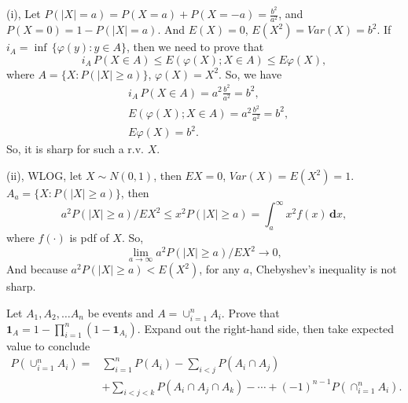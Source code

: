 \documentclass[en, normal, 11pt, black]{elegantnote}
\newenvironment{exercise}[1]{\begin{tcolorbox}[colback=black!15, colframe=black!80, breakable, title=#1]}{\end{tcolorbox}}
\renewenvironment{proof}{\begin{tcolorbox}[colback=white, colframe=black!50, breakable, title=Proof. ]\setlength{\parskip}{0.8em}}{\,\\\rightline{$\square$}\end{tcolorbox}}
\newcommand{\der}{\,\mathbf{d}}
\begin{document}
    \begin{proof}
        (i), Let $P(|X|=a)=P(X=a)+P(X=-a)=\frac{b^2}{a^2}$, and $P(X=0)=1-P(|X|=a)$. And $E(X)=0$, $E(X^2)=Var(X)=b^2$. If $i_{A}=\inf\,\{\varphi(y): y \in A\}$, then we need to prove that
        \[
            i_{A}\,P(X \in A) \leq E(\varphi(X) ; X \in A) \leq E \varphi(X), 
        \]
        where $A=\{X:P(|X|\geqslant a)\}$, $\varphi(X)=X^2$. So, we have
        \begin{align*}
            &i_{A}\,P(X \in A)=a^2\frac{b^2}{a^2}=b^2, \\
            &E(\varphi(X) ; X \in A)=a^2\frac{b^2}{a^2}=b^2, \\
            &E \varphi(X)=b^2. 
        \end{align*}
        So, it is sharp for such a r.v. $X$. 
        
        (ii), WLOG, let $X\sim N(0,1)$, then $EX=0$, $Var(X)=E(X^2)=1$. $A_a=\{X:P(|X|\geqslant a)\}$, then
        \[
            a^{2} P(|X| \geq a) / E X^{2}\leqslant x^2 P(|X| \geq a)=\int_{a}^\infty x^2 f(x)\der x, 
        \]
        where $f(\cdot)$ is pdf of $X$. So, 
        \[
            \lim_{a\to\infty}a^{2} P(|X| \geq a) / E X^{2}\longrightarrow 0, 
        \]
        And because $a^{2} P(|X| \geq a)<E(X^2)$, for any $a$, Chebyshev’s inequality is not sharp. 
    \end{proof}


    \begin{exercise}{1.6.9. Inclusion-exclusion formula.}
        Let $A_{1}, A_{2}, \ldots A_{n}$ be events and $A=\cup_{i=1}^{n} A_{i}$. Prove that $\mathbf{1}_{A}=1-\prod_{i=1}^{n}\left(1-\mathbf{1}_{A_{i}}\right)$. Expand out the right-hand side, then take expected value to conclude
        \begin{align*}
            P\left(\cup_{i=1}^{n} A_{i}\right)=& \sum_{i=1}^{n} P\left(A_{i}\right)-\sum_{i<j} P\left(A_{i} \cap A_{j}\right) \\
            &+\sum_{i<j<k} P\left(A_{i} \cap A_{j} \cap A_{k}\right)-\cdots+(-1)^{n-1} P\left(\cap_{i=1}^{n} A_{i}\right). 
        \end{align*}
    \end{exercise}
\end{document}

